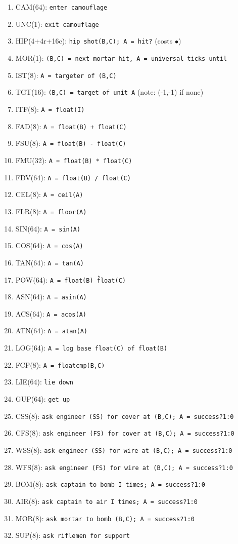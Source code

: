 \documentclass{article}
\begin{document}
\begin{enumerate}[noitemsep]
    \item CAM(64): \texttt{enter camouflage}
    \item UNC(1): \texttt{exit camouflage}
    \item HIP(4+4r+16c): \texttt{hip shot(B,C); A = hit?} (costs $\bullet$)
    \item MOR(1): \texttt{(B,C) = next mortar hit, A = universal ticks until}
    \item IST(8): \texttt{A = targeter of (B,C)}
    \item TGT(16): \texttt{(B,C) = target of unit A} (note: (-1,-1) if none)
    \item ITF(8): \texttt{A = float(I)}
    \item FAD(8): \texttt{A = float(B) + float(C)}
    \item FSU(8): \texttt{A = float(B) - float(C)}
    \item FMU(32): \texttt{A = float(B) * float(C)}
    \item FDV(64): \texttt{A = float(B) / float(C)}
    \item CEL(8): \texttt{A = ceil(A)}
    \item FLR(8): \texttt{A = floor(A)}
    \item SIN(64): \texttt{A = sin(A)}
    \item COS(64): \texttt{A = cos(A)}
    \item TAN(64): \texttt{A = tan(A)}
    \item POW(64): \texttt{A = float(B) \^ float(C)}
    \item ASN(64): \texttt{A = asin(A)}
    \item ACS(64): \texttt{A = acos(A)}
    \item ATN(64): \texttt{A = atan(A)}
    \item LOG(64): \texttt{A = log base float(C) of float(B)}
    \item FCP(8): \texttt{A = floatcmp(B,C)}
    \item LIE(64): \texttt{lie down}
    \item GUP(64): \texttt{get up}
    \item CSS(8): \texttt{ask engineer (SS) for cover at (B,C); A = success?1:0}
    \item CFS(8): \texttt{ask engineer (FS) for cover at (B,C); A = success?1:0}
    \item WSS(8): \texttt{ask engineer (SS) for wire at (B,C); A = success?1:0}
    \item WFS(8): \texttt{ask engineer (FS) for wire at (B,C); A = success?1:0}
    \item BOM(8): \texttt{ask captain to bomb I times; A = success?1:0}
    \item AIR(8): \texttt{ask captain to air I times; A = success?1:0}
    \item MOR(8): \texttt{ask mortar to bomb (B,C); A = success?1:0}
    \item SUP(8): \texttt{ask riflemen for support}
\end{enumerate}
\end{document}
